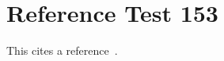 \documentclass{article}
\begin{document}
\section{Reference Test 153}
This cites a reference~\cite{test153}.

\end{document}
